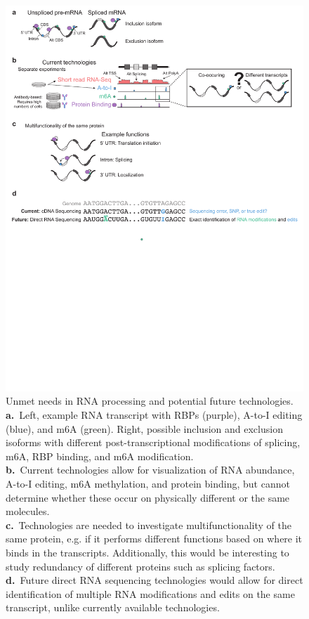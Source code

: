 \begin{figure}
  \centering
  \includegraphics[width=5.8in]{figures/singlecell_future_methods}
  \caption[Unmet needs in RNA processing and potential future technologies.]{Unmet needs in RNA processing and potential future technologies.\\
\textbf{a.}~Left, example RNA transcript with RBPs (purple), A-to-I editing (blue), and m6A (green). Right,  possible inclusion and exclusion isoforms with different post-transcriptional modifications of splicing, m6A, RBP binding, and m6A modification.\\
\textbf{b.}~Current technologies allow for visualization of RNA abundance, A-to-I editing, m6A methylation, and protein binding, but cannot determine whether these occur on physically different or the same molecules.\\
\textbf{c.}~Technologies are needed to investigate multifunctionality of the same protein, e.g. if it performs different functions based on where it binds in the transcripts. Additionally, this would be interesting to study redundancy of different proteins such as splicing factors.\\
\textbf{d.}~Future direct RNA sequencing technologies would allow for direct identification of multiple RNA modifications and edits on the same transcript, unlike currently available technologies.}
\label{fig:singlecell_future_methods}
\end{figure}

